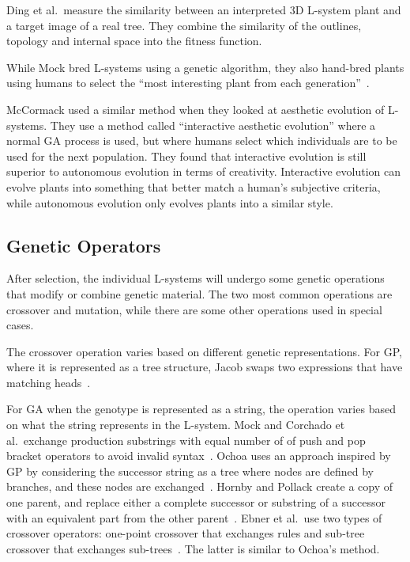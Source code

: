 Ding et al.\ measure the similarity between an interpreted 3D \gls{L-system} plant and a target image of a real tree.
They combine the similarity of the outlines, topology and internal space into the fitness function.~\cite{2013Ding}

While Mock bred \glspl{L-system} using a genetic algorithm, they also hand-bred plants using humans to select the ``most interesting plant from each generation''~\cite{1998Mock}.

McCormack used a similar method when they looked at aesthetic evolution of \glspl{L-system}.
They use a method called ``interactive aesthetic evolution'' where a normal \gls{GA} process is used, but where humans select which individuals are to be used for the next population.
They found that interactive evolution is still superior to autonomous evolution in terms of creativity.
Interactive evolution can evolve plants into something that better match a human's subjective criteria, while autonomous evolution only evolves plants into a similar style.~\cite{2004McCormack}

\subsection{Genetic Operators}
After selection, the individual \glspl{L-system} will undergo some genetic operations that modify or combine genetic material.
The two most common operations are crossover and mutation, while there are some other operations used in special cases.

The crossover operation varies based on different genetic representations.
For \gls{GP}, where it is represented as a tree structure, Jacob swaps two expressions that have matching heads~\cite{1994Jacob,1995Jacob}.

For \gls{GA} when the genotype is represented as a string, the operation varies based on what the string represents in the \gls{L-system}.
Mock and Corchado et al.\ exchange production substrings with equal number of of push and pop bracket operators to avoid invalid syntax~\cite{1998Mock,2009Corchado}.
Ochoa uses an approach inspired by \gls{GP} by considering the successor string as a tree where nodes are defined by branches, and these nodes are exchanged~\cite{1998Ochoa}.
Hornby and Pollack create a copy of one parent, and replace either a complete successor or substring of a successor with an equivalent part from the other parent~\cite{2001Hornby}.
Ebner et al.\ use two types of crossover operators: one-point crossover that exchanges rules and sub-tree crossover that exchanges sub-trees~\cite{2002Ebner,2003Ebner}.
The latter is similar to Ochoa's method.

